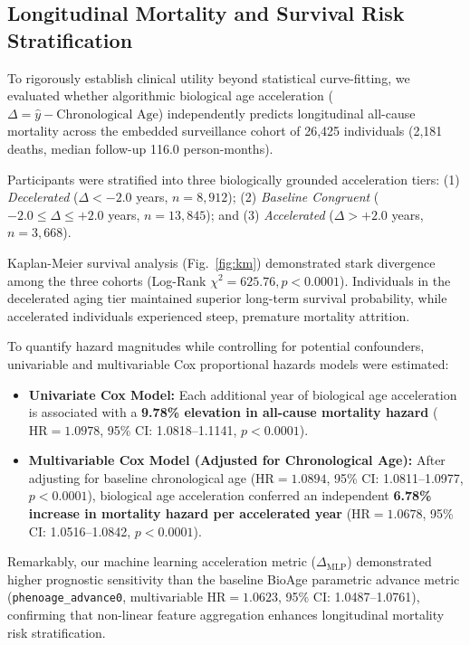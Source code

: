 \documentclass[conference]{IEEEtran}
\begin{document}
\subsection{Longitudinal Mortality and Survival Risk Stratification}
To rigorously establish clinical utility beyond statistical curve-fitting, we evaluated whether algorithmic biological age acceleration ($\Delta = \hat{y} - \text{Chronological Age}$) independently predicts longitudinal all-cause mortality across the embedded surveillance cohort of 26,425 individuals (2,181 deaths, median follow-up 116.0 person-months).

Participants were stratified into three biologically grounded acceleration tiers: (1) \textit{Decelerated} ($\Delta < -2.0$ years, $n = 8,912$); (2) \textit{Baseline Congruent} ($-2.0 \le \Delta \le +2.0$ years, $n = 13,845$); and (3) \textit{Accelerated} ($\Delta > +2.0$ years, $n = 3,668$).

Kaplan-Meier survival analysis (Fig.~\ref{fig:km}) demonstrated stark divergence among the three cohorts (Log-Rank $\chi^2 = 625.76, p < 0.0001$). Individuals in the decelerated aging tier maintained superior long-term survival probability, while accelerated individuals experienced steep, premature mortality attrition.

To quantify hazard magnitudes while controlling for potential confounders, univariable and multivariable Cox proportional hazards models were estimated:
\begin{itemize}
    \item \textbf{Univariate Cox Model:} Each additional year of biological age acceleration is associated with a \textbf{9.78\% elevation in all-cause mortality hazard} ($\text{HR} = 1.0978$, 95\% CI: 1.0818--1.1141, $p < 0.0001$).
    \item \textbf{Multivariable Cox Model (Adjusted for Chronological Age):} After adjusting for baseline chronological age ($\text{HR} = 1.0894$, 95\% CI: 1.0811--1.0977, $p < 0.0001$), biological age acceleration conferred an independent \textbf{6.78\% increase in mortality hazard per accelerated year} ($\text{HR} = 1.0678$, 95\% CI: 1.0516--1.0842, $p < 0.0001$).
\end{itemize}

Remarkably, our machine learning acceleration metric ($\Delta_{\text{MLP}}$) demonstrated higher prognostic sensitivity than the baseline BioAge parametric advance metric (\texttt{phenoage\_advance0}, multivariable $\text{HR} = 1.0623$, 95\% CI: 1.0487--1.0761), confirming that non-linear feature aggregation enhances longitudinal mortality risk stratification.
\end{document}
